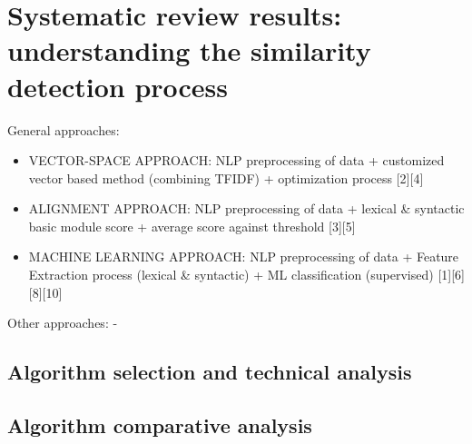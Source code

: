 
\chapter{Systematic review results: understanding the similarity detection process} %
\label{Chapter3} %

General approaches:

\begin{itemize}
\item VECTOR-SPACE APPROACH: NLP preprocessing of data + customized vector based method (combining TFIDF) + optimization process [2][4]
\item ALIGNMENT APPROACH: NLP preprocessing of data + lexical \& syntactic basic module score + average score against threshold [3][5]
\item MACHINE LEARNING APPROACH: NLP preprocessing of data + Feature Extraction process (lexical \& syntactic) + ML classification (supervised) [1][6][8][10]
\end{itemize}

Other approaches:
- 

\section{Algorithm selection and technical analysis}

\section{Algorithm comparative analysis}
